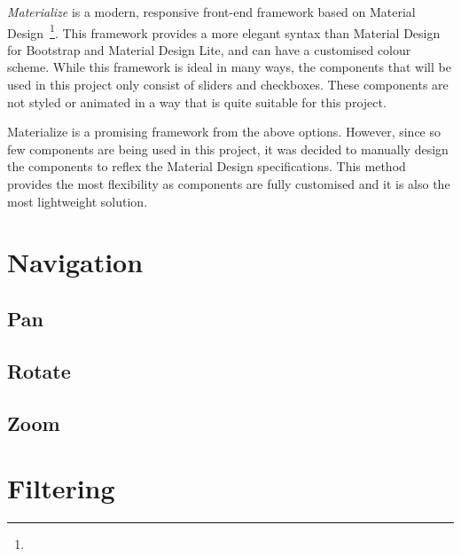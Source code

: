 {{		\emph{Materialize} is a modern, responsive front-end framework based on Material Design~\footnote{}. This framework provides a more elegant syntax than Material Design for Bootstrap and Material Design Lite, and can have a customised colour scheme. While this framework is ideal in many ways, the components that will be used in this project only consist of sliders and checkboxes. These components are not styled or animated in a way that is quite suitable for this project.

		Materialize is a promising framework from the above options. However, since so few components are being used in this project, it was decided to manually design the components to reflex the Material Design specifications. This method provides the most flexibility as components are fully customised and it is also the most lightweight solution.

	}

}
	
\section{Navigation} {
\label{sec:navigation}

	\subsection{Pan} {
	\label{sec:pan}

	}

	\subsection{Rotate} {
	\label{sec:rotate}

	
	}

	\subsection{Zoom} {
	\label{sec:zoom}
	
	}

}

\section{Filtering} {
\label{sec:filtering}


}


